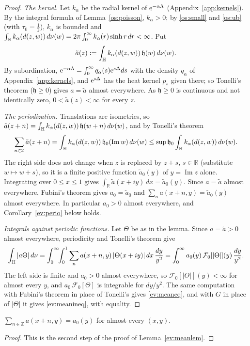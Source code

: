 \begin{proof}
\emph{The kernel.} Let $k_\alpha$ be the radial kernel of $\mathrm{e}^{-\alpha\Lambda}$ (Appendix~\ref{app:kernels}). By the integral formula of
Lemma~\ref{os:poisson}, $k_\alpha>0$; by \eqref{os:small} and \eqref{os:ub} (with $\tau_0=\tfrac12$), $k_\alpha$ is bounded and
$\int_{\mathbb{H}} k_\alpha(d(z,w))\,d\nu(w)=2\pi\int_0^\infty k_\alpha(r)\sinh r\,dr<\infty$. Put
\[
  \tilde a(z):=\int_{\mathbb{H}} k_\alpha(d(z,w))\,\mathfrak h(w)\,d\nu(w).
\]
By subordination, $\mathrm{e}^{-\alpha\Lambda}=\int_0^\infty q_\alpha(s)\mathrm{e}^{s\Delta}ds$ with the density $q_\alpha$ of Appendix~\ref{app:kernels}, and
$\mathrm{e}^{s\Delta}$ has the heat kernel $p_s$ given there; so Tonelli's theorem ($\mathfrak h\ge0$) gives
$a=\tilde a$ almost everywhere. As $\mathfrak h\ge0$ is continuous and not identically zero, $0<\tilde a(z)<\infty$ for every $z$.

\emph{The periodization.} Translations are isometries, so $\tilde a(z+n)=\int_{\mathbb{H}} k_\alpha(d(z,w))\,\mathfrak h(w+n)\,d\nu(w)$, and by Tonelli's theorem
\[
  \sum_{n\in\mathbb Z}\tilde a(z+n)=\int_{\mathbb{H}} k_\alpha(d(z,w))\,\mathfrak h_0(\operatorname{Im}w)\,d\nu(w)\le\sup\mathfrak h_0\int_{\mathbb{H}} k_\alpha(d(z,w))\,d\nu(w).
\]
The right side does not change when $z$ is replaced by $z+s$, $s\in\mathbb R$ (substitute $w\mapsto w+s$), so it is a finite positive
function $\tilde a_0(y)$ of $y=\operatorname{Im}z$ alone. Integrating over $0\le x\le1$ gives $\int_{\mathbb R}\tilde a(x+iy)\,dx=\tilde a_0(y)$. Since
$a=\tilde a$ almost everywhere, Fubini's theorem gives $a_0=\tilde a_0$ and $\sum_na(x+n,y)=\tilde a_0(y)$ almost everywhere. In particular
$a_0>0$ almost everywhere, and Corollary~\ref{ev:perio} below holds.

\emph{Integrals against periodic functions.} Let $\Theta$ be as in the lemma. Since $a=\tilde a>0$ almost everywhere, periodicity and Tonelli's theorem give
\[
  \int_{\mathbb{H}}|a\Theta|\,d\nu=\int_0^\infty\!\!\int_0^1\sum_na(x+n,y)\,|\Theta(x+iy)|\,dx\,\frac{dy}{y^2}=\int_0^\infty a_0(y)\,\mathcal F_0[|\Theta|](y)\,\frac{dy}{y^2}.
\]
The left side is finite and $a_0>0$ almost everywhere, so $\mathcal F_0[|\Theta|](y)<\infty$ for almost every $y$, and $a_0\,\mathcal F_0[\Theta]$ is
integrable for $dy/y^2$. The same computation with Fubini's theorem in place of Tonelli's gives \eqref{ev:meaneq}, and with $G$ in place
of $|\Theta|$ it gives \eqref{ev:meanineq}, with equality.
\end{proof}

\begin{corollary}\label{ev:perio}
$\sum_{n\in\mathbb Z}a(x+n,y)=a_0(y)$ for almost every $(x,y)$.
\end{corollary}
\begin{proof}
This is the second step of the proof of Lemma~\ref{ev:meanlem}.
\end{proof}


